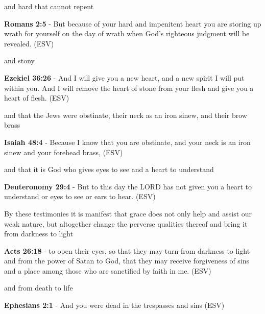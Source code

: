\documentclass[11pt]{article}
\begin{document}
and hard that cannot repent

\textbf{Romans 2:5} -   But because of your hard and impenitent heart you are storing up wrath for yourself on the day of wrath when God's righteous judgment will be revealed.  (ESV)

and stony

\textbf{Ezekiel 36:26} -   And I will give you a new heart, and a new spirit I will put within you.  And I will remove the heart of stone from your flesh and give you a heart of flesh.  (ESV)

and that the Jews were obstinate,
their neck as an iron sinew, and their brow
brass

\textbf{Isaiah 48:4} -  Because I know that you are obstinate, and your neck is an iron sinew and your forehead brass,  (ESV)

and that it is God who gives eyes to
see and a heart to understand

\textbf{Deuteronomy 29:4} -   But to this day the LORD has not given you a heart to understand or eyes to see or ears to hear.  (ESV)

By these testimonies it is manifest that grace
does not only help and assist our weak nature,
but altogether change the perverse qualities
thereof and bring it from darkness to light

\textbf{Acts 26:18} -   to open their eyes, so that they may turn from darkness to light and from the power of Satan to God, that they may receive forgiveness of sins and a place among those who are sanctified by faith in me.  (ESV)

and from death to life

\textbf{Ephesians 2:1} -   And you were dead in the trespasses and sins  (ESV)
\end{document}
